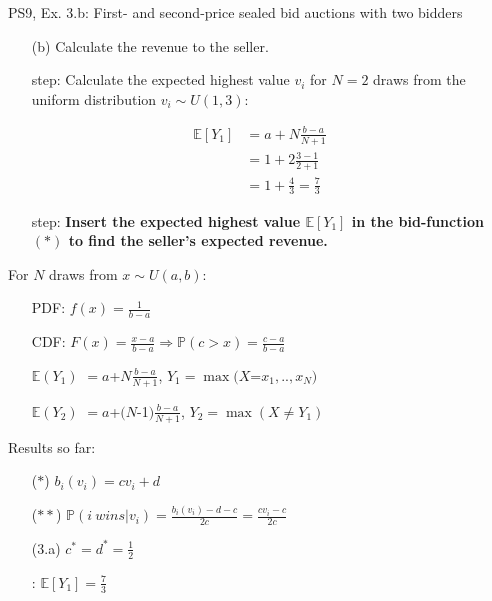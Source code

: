 \begin{frame}{PS9, Ex. 3.b: First- and second-price sealed bid auctions with two bidders}
    \begin{multicols}{2}
      \begin{itemize}
        \item[(b)] Calculate the revenue to the seller.
        \item[\nth{1} step:] Calculate the expected highest value $v_i$ for $N=2$ draws from the uniform distribution $v_i\sim U(1,3)$:
      \end{itemize}
      \vspace{-8pt}
      \begin{align*}
        \mathbb{E}[Y_1]&=a+N\frac{b-a}{N+1}\\
                       &=1+2\frac{3-1}{2+1}\\
                       &=1+\frac{4}{3}=\frac{7}{3}
      \end{align*}
      \vspace{-12pt}
      \begin{itemize}
        \item[\nth{2} step:] \textbf{Insert the expected highest value $\mathbb{E}[Y_1]$ in the bid-function $(*)$  to find the seller's expected revenue.}
      \end{itemize}
      \vfill\null\columnbreak
      For $N$ draws from $x\sim U(a, b):$
      \vspace{-6pt}
      \begin{enumerate}
        \item[PDF:] $f(x)=\frac{1}{b-a}$
        \item[CDF:] $F(x)=\frac{x-a}{b-a}\Rightarrow\mathbb{P}(c>x)=\frac{c-a}{b-a}$
        \item[$\mathbb{E}(Y_1)$] $=a$+$N\frac{b-a}{N+1}$, $Y_1=\max(X$=$x_1,..,x_N)$
        \item[$\mathbb{E}(Y_2)$] $=a$+$(N$-1$)\frac{b-a}{N+1}$, $Y_2=\max(X\neq Y_1)$
      \end{enumerate}
      \vspace{-6pt}
      Results so far:
      \vspace{-6pt}
      \begin{itemize}
        \item[($*$)]  $b_i(v_i) = cv_i+d$
        \item[($**$)] $\mathbb{P}(i\ wins|v_i)=\frac{b_i(v_i)-d-c}{2c}=\frac{cv_i-c}{2c}$
        \item[(3.a)]    $c^*=d^*=\frac{1}{2}$
        \item[\nth{1}:] $\mathbb{E}[Y_1]=\frac{7}{3}$
      \end{itemize}
      \vfill\null
    \end{multicols}
\end{frame}
